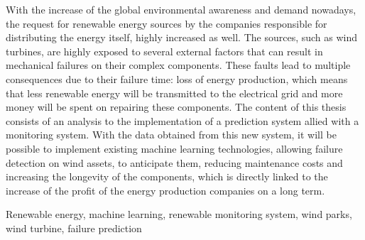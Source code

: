 


With the increase of the global environmental awareness and demand nowadays, the request for renewable energy sources by the companies responsible for distributing the energy itself, highly increased as well. The sources, such as wind turbines, are highly exposed to several external factors that can result in mechanical failures on their complex components. These faults lead to multiple consequences due to their failure time: loss of energy production, which means that less renewable energy will be transmitted to the electrical grid and more money will be spent on repairing these components. The content of this thesis consists of an analysis to the implementation of a prediction system allied with a monitoring system. With the data obtained from this new system, it will be possible to implement existing machine learning technologies, allowing failure detection on wind assets, to anticipate them, reducing maintenance costs and increasing the longevity of the components, which is directly linked to the increase of the profit of the energy production companies on a long term.

\begin{keywords}
Renewable energy, machine learning, renewable monitoring system, wind parks, wind turbine, failure prediction
\end{keywords} 
